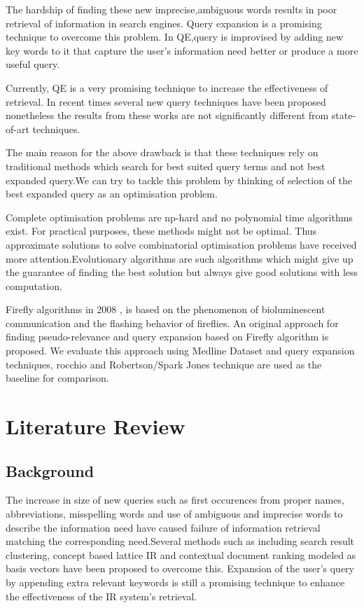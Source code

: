 \documentclass{nitk}
\begin{document}
The hardship of finding these new imprecise,ambiguous words results in poor retrieval of information in search engines. Query expansion is a promising technique to overcome this problem.
In QE,query is improvised by adding new key words to it that capture the user's information need better or produce a more useful query. 

Currently, QE is a very promising technique to increase the effectiveness of retrieval. In recent times several new query techniques have been proposed nonetheless the results from these works are not significantly different from state-of-art techniques.

The main reason for the above drawback is that these techniques rely on traditional methods which search for best suited query terms and not best expanded query.We can try to tackle this problem by thinking of selection of the best expanded query as an optimisation problem.

Complete optimisation problems are np-hard and no polynomial time algorithms exist. For practical purposes, these methods might not be optimal. Thus approximate solutions to solve combinatorial optimisation problems have received more attention.Evolutionary algorithms are such algorithms which might give up the guarantee of finding the best solution but always give good solutions with less computation.

Firefly algorithms in 2008 \cite{yang1},\cite{yang2} is based on the phenomenon of bioluminescent communication and the flashing behavior of fireflies. 
 An original approach for finding pseudo-relevance and query expansion based on Firefly algorithm is proposed. We evaluate this approach using Medline Dataset and query expansion techniques, rocchio\cite{Rocchio} and Robertson/Spark Jones\cite{rsj} technique are used as the baseline for comparison.
\newpage
\section{Literature Review}
\subsection{Background}
The increase in size of new queries such as first occurences from proper names, abbreviations, misspelling words and use of ambiguous and imprecise words to describe the information need have caused failure of information retrieval matching the corresponding need.Several methods such as  including search result clustering, concept based lattice IR and contextual document ranking modeled as basis vectors have been proposed to overcome this. Expansion of  the user's query by appending extra relevant keywords is still a promising technique to enhance the effectiveness of the IR system's retrieval.
 
\end{document}
